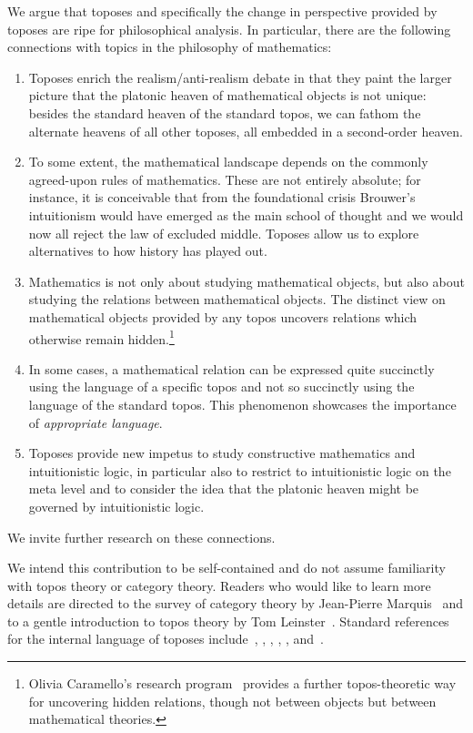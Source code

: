 \documentclass[oneside,reqno]{amsart}
\theoremstyle{definition}
\theoremstyle{plain}
\theoremstyle{remark}
\renewcommand{\_}{\mathpunct{.}\,}
\newcommand{\?}{\,{:}\,}
\begin{document}
We argue that toposes and specifically the change in perspective provided by
toposes are ripe for philosophical analysis. In particular, there are the
following connections with topics in the philosophy of mathematics:
\begin{enumerate}
\item Toposes enrich the realism/anti-realism debate in that they paint the larger
picture that the platonic heaven of mathematical objects is not unique: besides
the standard heaven of the standard topos, we can fathom the alternate
heavens of all other toposes, all embedded in a second-order heaven.
\item To some extent, the mathematical landscape depends on the commonly agreed-upon rules of
mathematics. These are not entirely absolute; for instance, it is conceivable
that from the foundational crisis Brouwer's intuitionism would have emerged as
the main school of thought and we would now all reject the law of excluded
middle. Toposes allow us to explore alternatives to how history
has played out.
\item Mathematics is not only about studying mathematical objects, but also
about studying the relations between mathematical objects. The distinct view
on mathematical objects provided by any topos uncovers relations which
otherwise remain hidden.\footnote{Olivia Caramello's research
program~\cite{caramello:tst} provides a further topos-theoretic way for
uncovering hidden relations, though not between objects but between mathematical
theories.}
\item In some cases, a mathematical relation can be expressed quite succinctly
using the language of a specific topos and not so succinctly using the language
of the standard topos. This phenomenon showcases the importance of
\emph{appropriate language}.
\item Toposes provide new impetus to study constructive mathematics and
intuitionistic logic, in particular also to restrict to intuitionistic
logic on the meta level and to consider the idea that the platonic heaven might
be governed by intuitionistic logic.
\end{enumerate}
We invite further research on these connections.

We intend this contribution to be self-contained and do not assume familiarity with
topos theory or category theory. Readers who would like to learn more details
are directed to the survey of category theory by Jean-Pierre
Marquis~\cite{sep:category-theory} and to a gentle introduction to topos theory
by Tom Leinster~\cite{leinster:introduction}. Standard references for the internal
language of toposes include~\cite[Chapter~VI]{moerdijk-maclane:sheaves-logic},
\cite[Chapter~14]{goldblatt:topoi},
\cite{caramello:preliminaries}, \cite{streicher:ctcl}, \cite{shulman:categorical-logic},
\cite[Chapter~6]{borceux:handbook3} and~\cite[Part~D]{johnstone:elephant}.
\end{document}
